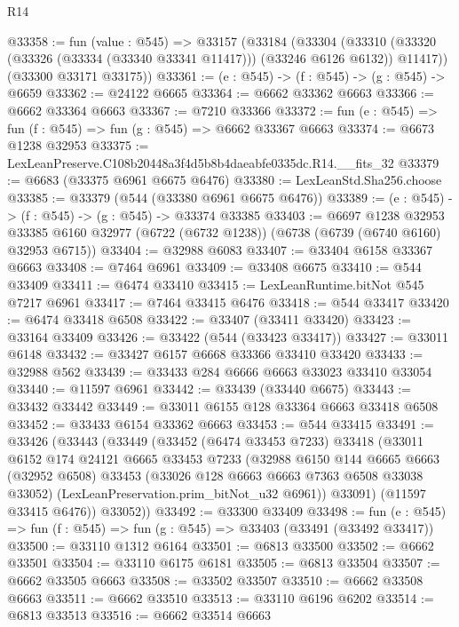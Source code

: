 \begin{lexlean}{R14}
\begin{coremodule}
@33358 := fun (value : @545) =>
  @33157
    (@33184
      (@33304
        (@33310 (@33320 (@33326 (@33334 (@33340 @33341 @11417))) (@33246 @6126 @6132)) @11417))
      (@33300 @33171 @33175))
@33361 := (e : @545) -> (f : @545) -> (g : @545) -> @6659
@33362 := @24122 @6665
@33364 := @6662 @33362 @6663
@33366 := @6662 @33364 @6663
@33367 := @7210 @33366
@33372 := fun (e : @545) => fun (f : @545) => fun (g : @545) => @6662 @33367 @6663
@33374 := @6673 @1238 @32953
@33375 := LexLeanPreserve.C108b20448a3f4d5b8b4daeabfe0335dc.R14.__fits_32
@33379 := @6683 (@33375 @6961 @6675 @6476)
@33380 := LexLeanStd.Sha256.choose
@33385 := @33379 (@544 (@33380 @6961 @6675 @6476))
@33389 := (e : @545) -> (f : @545) -> (g : @545) -> @33374 @33385
@33403 := @6697
    @1238
    @32953
    @33385
    @6160
    @32977
    (@6722 (@6732 @1238))
    (@6738 (@6739 (@6740 @6160) @32953 @6715))
@33404 := @32988 @6083
@33407 := @33404 @6158 @33367 @6663
@33408 := @7464 @6961
@33409 := @33408 @6675
@33410 := @544 @33409
@33411 := @6474 @33410
@33415 := LexLeanRuntime.bitNot @545 @7217 @6961
@33417 := @7464 @33415 @6476
@33418 := @544 @33417
@33420 := @6474 @33418 @6508
@33422 := @33407 (@33411 @33420)
@33423 := @33164 @33409
@33426 := @33422 (@544 (@33423 @33417))
@33427 := @33011 @6148
@33432 := @33427 @6157 @6668 @33366 @33410 @33420
@33433 := @32988 @562
@33439 := @33433 @284 @6666 @6663 @33023 @33410 @33054
@33440 := @11597 @6961
@33442 := @33439 (@33440 @6675)
@33443 := @33432 @33442
@33449 := @33011 @6155 @128 @33364 @6663 @33418 @6508
@33452 := @33433 @6154 @33362 @6663
@33453 := @544 @33415
@33491 := @33426
    (@33443
      (@33449
        (@33452
          (@6474 @33453 @7233)
          @33418
          (@33011
            @6152
            @174
            @24121
            @6665
            @33453
            @7233
            (@32988
              @6150
              @144
              @6665
              @6663
              (@32952 @6508)
              @33453
              (@33026 @128 @6663 @6663 @7363 @6508 @33038 @33052)
              (LexLeanPreservation.prim_bitNot_u32 @6961))
            @33091)
          (@11597 @33415 @6476))
        @33052))
@33492 := @33300 @33409
@33498 := fun (e : @545) => fun (f : @545) => fun (g : @545) => @33403 (@33491 (@33492 @33417))
@33500 := @33110 @1312 @6164
@33501 := @6813 @33500
@33502 := @6662 @33501
@33504 := @33110 @6175 @6181
@33505 := @6813 @33504
@33507 := @6662 @33505 @6663
@33508 := @33502 @33507
@33510 := @6662 @33508 @6663
@33511 := @6662 @33510
@33513 := @33110 @6196 @6202
@33514 := @6813 @33513
@33516 := @6662 @33514 @6663

\end{coremodule}
\end{lexlean}
